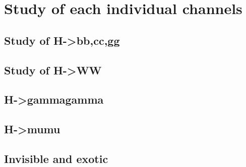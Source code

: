\section{Study of each individual channels}
\label{sec:channels}

\subsection{Study of H->bb,cc,gg}
\subsection{Study of H->WW}
\subsection{H->gammagamma}
\subsection{H->mumu}
\subsection{Invisible and exotic}
